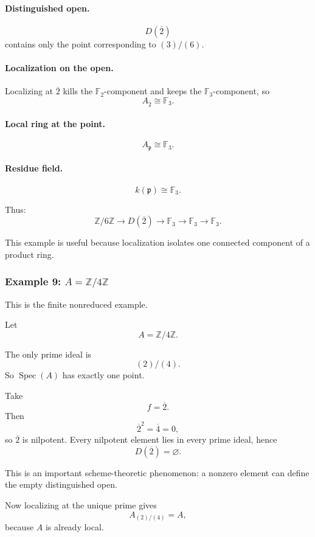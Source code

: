 \documentclass[12pt,a4paper]{article}
\theoremstyle{notespace}
\newcommand{\Spec}{\operatorname{Spec}}
\newcommand{\mf}{\mathfrak}
\theoremstyle{definition}
\begin{document}
\paragraph{Distinguished open.}
\[
D(\overline{2})
\]
contains only the point corresponding to \((3)/(6)\).

\paragraph{Localization on the open.}
Localizing at \(\overline{2}\) kills the \(\mathbb F_2\)-component and keeps the \(\mathbb F_3\)-component, so
\[
A_{\overline{2}}\cong \mathbb F_3.
\]

\paragraph{Local ring at the point.}
\[
A_{\mf p}\cong \mathbb F_3.
\]

\paragraph{Residue field.}
\[
k(\mf p)\cong \mathbb F_3.
\]

Thus:
\[
\mathbb Z/6\mathbb Z
\longrightarrow
D(\overline{2})
\longrightarrow
\mathbb F_3
\longrightarrow
\mathbb F_3
\longrightarrow
\mathbb F_3.
\]

This example is useful because localization isolates one connected component of a product ring.

\subsubsection{Example 9: \(A=\mathbb Z/4\mathbb Z\)}

This is the finite nonreduced example.

Let
\[
A=\mathbb Z/4\mathbb Z.
\]

The only prime ideal is
\[
(2)/(4).
\]
So \(\Spec(A)\) has exactly one point.

Take
\[
f=\overline{2}.
\]
Then
\[
\overline{2}^2=\overline{4}=0,
\]
so \(\overline{2}\) is nilpotent. Every nilpotent element lies in every prime ideal, hence
\[
D(\overline{2})=\varnothing.
\]

This is an important scheme-theoretic phenomenon: a nonzero element can define the empty distinguished open.

Now localizing at the unique prime gives
\[
A_{(2)/(4)}=A,
\]
because \(A\) is already local.
\end{document}
